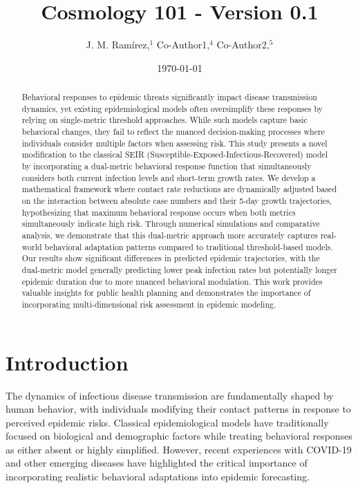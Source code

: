 \documentclass{article}\usepackage{graphicx} \usepackage{amsmath} \usepackage{colortbl}\title{Cosmology 101 - Version 0.1}
\author{J. M. Ram{\'i}rez,$^{1}$ Co-Author1,$^{4}$ Co-Author2,$^{5}$}
\date{\today}
\begin{document}
\maketitle\begin{abstract} Behavioral responses to epidemic threats significantly impact disease transmission dynamics, yet existing epidemiological models often oversimplify these responses by relying on single-metric threshold approaches. While such models capture basic behavioral changes, they fail to reflect the nuanced decision-making processes where individuals consider multiple factors when assessing risk.  This study presents a novel modification to the classical SEIR (Susceptible-Exposed-Infectious-Recovered) model by incorporating a dual-metric behavioral response function that simultaneously considers both current infection levels and short-term growth rates. We develop a mathematical framework where contact rate reductions are dynamically adjusted based on the interaction between absolute case numbers and their 5-day growth trajectories, hypothesizing that maximum behavioral response occurs when both metrics simultaneously indicate high risk.  Through numerical simulations and comparative analysis, we demonstrate that this dual-metric approach more accurately captures real-world behavioral adaptation patterns compared to traditional threshold-based models. Our results show significant differences in predicted epidemic trajectories, with the dual-metric model generally predicting lower peak infection rates but potentially longer epidemic duration due to more nuanced behavioral modulation. This work provides valuable insights for public health planning and demonstrates the importance of incorporating multi-dimensional risk assessment in epidemic modeling. \end{abstract}\section{Introduction}
The dynamics of infectious disease transmission are fundamentally shaped by human behavior, with individuals modifying their contact patterns in response to perceived epidemic risks. Classical epidemiological models have traditionally focused on biological and demographic factors while treating behavioral responses as either absent or highly simplified. However, recent experiences with COVID-19 and other emerging diseases have highlighted the critical importance of incorporating realistic behavioral adaptations into epidemic forecasting.
\end{document}
